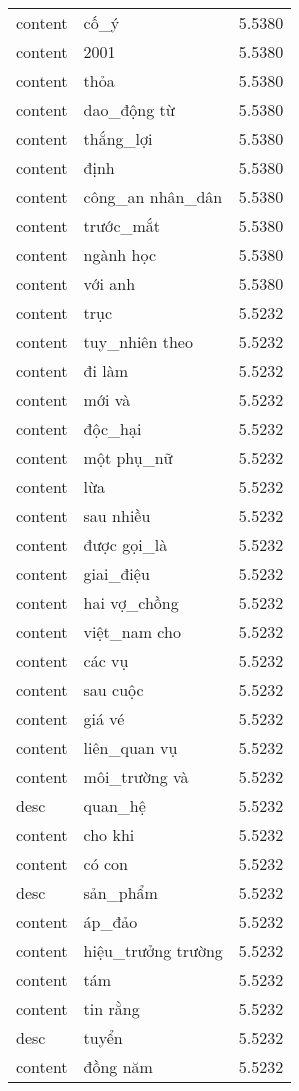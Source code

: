 \documentclass{article}
\begin{document}
\begin{tabular}{lll}
content & cố\_ý & 5.5380\\
content & 2001 & 5.5380\\
content & thỏa & 5.5380\\
content & dao\_động từ & 5.5380\\
content & thắng\_lợi & 5.5380\\
content & định & 5.5380\\
content & công\_an nhân\_dân & 5.5380\\
content & trước\_mắt & 5.5380\\
content & ngành học & 5.5380\\
content & với anh & 5.5380\\
content & trục & 5.5232\\
content & tuy\_nhiên theo & 5.5232\\
content & đi làm & 5.5232\\
content & mới và & 5.5232\\
content & độc\_hại & 5.5232\\
content & một phụ\_nữ & 5.5232\\
content & lừa & 5.5232\\
content & sau nhiều & 5.5232\\
content & được gọi\_là & 5.5232\\
content & giai\_điệu & 5.5232\\
content & hai vợ\_chồng & 5.5232\\
content & việt\_nam cho & 5.5232\\
content & các vụ & 5.5232\\
content & sau cuộc & 5.5232\\
content & giá vé & 5.5232\\
content & liên\_quan vụ & 5.5232\\
content & môi\_trường và & 5.5232\\
desc & quan\_hệ & 5.5232\\
content & cho khi & 5.5232\\
content & có con & 5.5232\\
desc & sản\_phẩm & 5.5232\\
content & áp\_đảo & 5.5232\\
content & hiệu\_trưởng trường & 5.5232\\
content & tám & 5.5232\\
content & tin rằng & 5.5232\\
desc & tuyển & 5.5232\\
content & đồng năm & 5.5232\\

\end{tabular}
\end{document}
